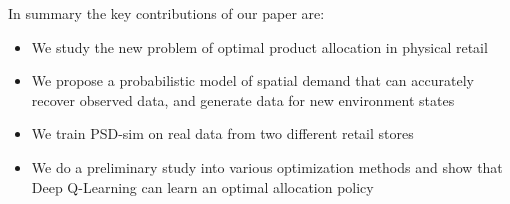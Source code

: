 In summary the key contributions of our paper are:

\begin{itemize}
    \item We study the new problem of optimal product allocation in physical retail
    \item We propose a probabilistic model of spatial demand that can accurately recover observed data, and generate data for new environment states
    \item We train PSD-sim on real data from two different retail stores
    \item We do a preliminary study into various optimization methods and show that Deep Q-Learning can learn an optimal allocation policy
\end{itemize}

